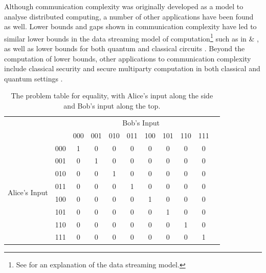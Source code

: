 \documentclass[a4paper]{article}
\begin{document}
        Although communication complexity was originally developed as a model to analyse distributed computing, a number of other applications have been found as well. Lower bounds and gaps shown in communication complexity have led to similar lower bounds in the data streaming model of computation\footnote{See \cite{TCS-002} for an explanation of the data streaming model.} such as in \cite{Gavinsky:2007:ESO:1250790.1250866} \& \cite{Verbin:2011:SCC:2133036.2133038}, as well as lower bounds for both quantum and classical circuits \cite{MSC:4265920, 366852}. Beyond the computation of lower bounds, other applications to communication complexity include classical security \cite{Gavinsky:2007:ESO:1250790.1250866} and secure multiparty computation in both classical and quantum settings \cite{Franklin:1992:CCS:129712.129780, Data2014, 1409.8488}.

        \begin{table}
            \begin{center}
                \begin{tabular}{|c|c|c|c|c|c|c|c|c|c|c|}
                    \hline
                    \multicolumn{2}{|c|}{}&\multicolumn{8}{|c|}{Bob's Input}\\\cline{3-10}
                    \multicolumn{2}{|c|}{}& 000 & 001 & 010 & 011 & 100 & 101 & 110 & 111\\\hline
                    \multirow{8}{*}{Alice's Input} & 000 & 1 & 0 & 0 & 0 & 0 & 0 & 0 & 0\\\cline{2-10}
                    & 001 & 0 & 1 & 0 & 0 & 0 & 0 & 0 & 0\\\cline{2-10}
                    & 010 & 0 & 0 & 1 & 0 & 0 & 0 & 0 & 0\\\cline{2-10}
                    & 011 & 0 & 0 & 0 & 1 & 0 & 0 & 0 & 0\\\cline{2-10}
                    & 100 & 0 & 0 & 0 & 0 & 1 & 0 & 0 & 0\\\cline{2-10}
                    & 101 & 0 & 0 & 0 & 0 & 0 & 1 & 0 & 0\\\cline{2-10}
                    & 110 & 0 & 0 & 0 & 0 & 0 & 0 & 1 & 0\\\cline{2-10}
                    & 111 & 0 & 0 & 0 & 0 & 0 & 0 & 0 & 1\\\hline
                \end{tabular}
            \end{center}
            \caption{The problem table for equality, with Alice's input along the side and Bob's input along the top.}
            \label{tab:eq}
        \end{table}
\end{document}
